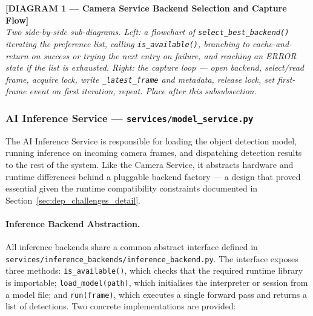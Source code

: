 \bigskip
\noindent\textbf{[DIAGRAM 1 — Camera Service Backend Selection and
Capture Flow]}\\
\textit{Two side-by-side sub-diagrams. Left: a flowchart of
\texttt{select\_best\_backend()} iterating the preference list,
calling \texttt{is\_available()}, branching to cache-and-return on
success or trying the next entry on failure, and reaching an ERROR
state if the list is exhausted. Right: the capture loop — open
backend, select/read frame, acquire lock, write
\texttt{\_latest\_frame} and metadata, release lock, set first-frame
event on first iteration, repeat. Place after this subsubsection.}
\bigskip



\subsubsection{AI Inference Service — \texttt{services/model\_service.py}}
\label{sec:inference_service}

The AI Inference Service is responsible for loading the object
detection model, running inference on incoming camera frames, and
dispatching detection results to the rest of the system. Like the
Camera Service, it abstracts hardware and runtime differences behind
a pluggable backend factory — a design that proved essential given
the runtime compatibility constraints documented in
Section~\ref{sec:dep_challenges_detail}.

\paragraph{Inference Backend Abstraction.}

All inference backends share a common abstract interface defined in
\texttt{services/inference\_backends/inference\_backend.py}. The
interface exposes three methods: \texttt{is\_available()}, which
checks that the required runtime library is importable;
\texttt{load\_model(path)}, which initialises the interpreter or
session from a model file; and \texttt{run(frame)}, which executes
a single forward pass and returns a list of detections. Two concrete
implementations are provided:

